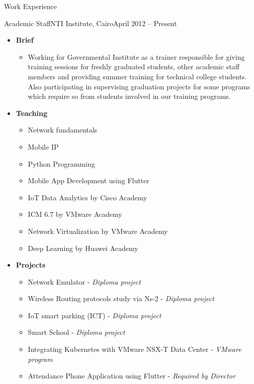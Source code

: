 \documentclass[]{mcdowellcv}
\begin{document}
	\begin{cvsection}{Work Experience}
		\begin{cvsubsection}{Academic Staff}{NTI Institute, Cairo}{April 2012 – Present}
			\begin{itemize}
				\item \textbf{Brief}
				\begin{itemize}
					\item Working for Governmental Institute as a trainer responsible for giving training sessions for freshly graduated students, other academic staff members and providing summer training for technical college students. Also participating in supervising graduation projects for some programs which require so from students involved in our training programs.
				\end{itemize}
                           \end{itemize}
			\begin{itemize}
				\item \textbf{Teaching}
				\begin{itemize}
					\item Network fundamentals
					\item Mobile IP
					\item Python Programming
					\item Mobile App Development using Flutter
					\item IoT Data Analytics by Cisco Academy
					\item ICM 6.7 by VMware Academy
					\item Network Virtualization by VMware Academy
					\item Deep Learning by Huawei Academy
				\end{itemize}
				\item \textbf{Projects}
				\begin{itemize}
					\item Network Emulator - \textit{Diploma project}
					\item Wireless Routing protocols study via Ns-2 - \textit{Diploma project}
					\item IoT smart parking (ICT) - \textit{Diploma project}
					\item Smart School - \textit{Diploma project}
					\item Integrating Kubernetes with VMware NSX-T Data Center - \textit{VMware program}
					\item Attendance Phone Application using Flutter - \textit{Required by Director}
				\end{itemize}
			\end{itemize}
			
		\end{cvsubsection}
		
	\end{cvsection}
	
\end{document}
